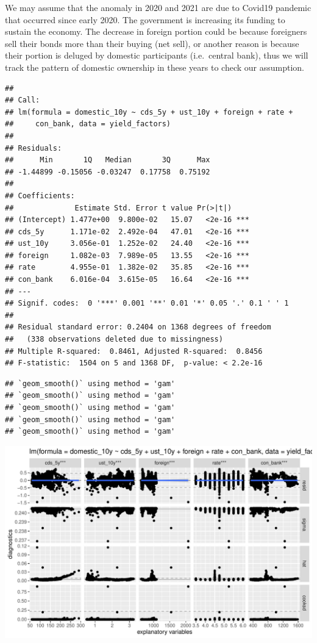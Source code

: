 \documentclass[11pt,a4paper,]{article}
\begin{document}
We may assume that the anomaly in 2020 and 2021 are due to Covid19 pandemic that occurred since early 2020. The government is increasing its funding to sustain the economy. The decrease in foreign portion could be because foreigners sell their bonds more than their buying (net sell), or another reason is because their portion is deluged by domestic participants (i.e.~central bank), thus we will track the pattern of domestic ownership in these years to check our assumption.

\begin{verbatim}
## 
## Call:
## lm(formula = domestic_10y ~ cds_5y + ust_10y + foreign + rate + 
##     con_bank, data = yield_factors)
## 
## Residuals:
##      Min       1Q   Median       3Q      Max 
## -1.44899 -0.15056 -0.03247  0.17758  0.75192 
## 
## Coefficients:
##              Estimate Std. Error t value Pr(>|t|)    
## (Intercept) 1.477e+00  9.800e-02   15.07   <2e-16 ***
## cds_5y      1.171e-02  2.492e-04   47.01   <2e-16 ***
## ust_10y     3.056e-01  1.252e-02   24.40   <2e-16 ***
## foreign     1.082e-03  7.989e-05   13.55   <2e-16 ***
## rate        4.955e-01  1.382e-02   35.85   <2e-16 ***
## con_bank    6.016e-04  3.615e-05   16.64   <2e-16 ***
## ---
## Signif. codes:  0 '***' 0.001 '**' 0.01 '*' 0.05 '.' 0.1 ' ' 1
## 
## Residual standard error: 0.2404 on 1368 degrees of freedom
##   (338 observations deleted due to missingness)
## Multiple R-squared:  0.8461, Adjusted R-squared:  0.8456 
## F-statistic:  1504 on 5 and 1368 DF,  p-value: < 2.2e-16
\end{verbatim}

\begin{verbatim}
## `geom_smooth()` using method = 'gam'
## `geom_smooth()` using method = 'gam'
## `geom_smooth()` using method = 'gam'
## `geom_smooth()` using method = 'gam'
## `geom_smooth()` using method = 'gam'
\end{verbatim}

\includegraphics{Untitled_files/figure-latex/unnamed-chunk-28-1.pdf}
\end{document}

